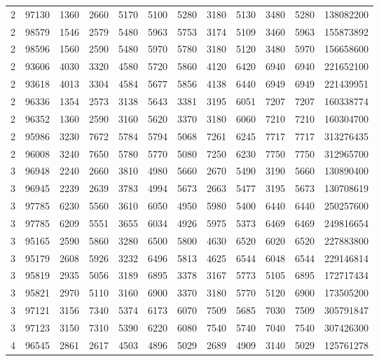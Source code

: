 \documentclass[journal]{IEEEtran}
\begin{document}
\begin{table}
\begin{tabular}{|cc|cccccccc|cc|}
2	&	97130	&	1360	&	2660	&	5170	&	5100	&	5280	&	3180	&	5130	&	3480	&	5280	&	138082200	\\
2	&	98579	&	1546	&	2579	&	5480	&	5963	&	5753	&	3174	&	5109	&	3460	&	5963	&	155873892	\\
2	&	98596	&	1560	&	2590	&	5480	&	5970	&	5780	&	3180	&	5120	&	3480	&	5970	&	156658600	\\
2	&	93606	&	4030	&	3320	&	4580	&	5720	&	5860	&	4120	&	6420	&	6940	&	6940	&	221652100	\\
2	&	93618	&	4013	&	3304	&	4584	&	5677	&	5856	&	4138	&	6440	&	6949	&	6949	&	221439951	\\
2	&	96336	&	1354	&	2573	&	3138	&	5643	&	3381	&	3195	&	6051	&	7207	&	7207	&	160338774	\\
2	&	96352	&	1360	&	2590	&	3160	&	5620	&	3370	&	3180	&	6060	&	7210	&	7210	&	160304700	\\
2	&	95986	&	3230	&	7672	&	5784	&	5794	&	5068	&	7261	&	6245	&	7717	&	7717	&	313276435	\\
2	&	96008	&	3240	&	7650	&	5780	&	5770	&	5080	&	7250	&	6230	&	7750	&	7750	&	312965700	\\
\hline																							
3	&	96948	&	2240	&	2660	&	3810	&	4980	&	5660	&	2670	&	5490	&	3190	&	5660	&	130890400	\\
3	&	96945	&	2239	&	2639	&	3783	&	4994	&	5673	&	2663	&	5477	&	3195	&	5673	&	130708619	\\
3	&	97785	&	6230	&	5560	&	3610	&	6050	&	4950	&	5980	&	5400	&	6440	&	6440	&	250257600	\\
3	&	97785	&	6209	&	5551	&	3655	&	6034	&	4926	&	5975	&	5373	&	6469	&	6469	&	249816654	\\
3	&	95165	&	2590	&	5860	&	3280	&	6500	&	5800	&	4630	&	6520	&	6020	&	6520	&	227883800	\\
3	&	95179	&	2608	&	5926	&	3232	&	6496	&	5813	&	4625	&	6544	&	6048	&	6544	&	229146814	\\
3	&	95819	&	2935	&	5056	&	3189	&	6895	&	3378	&	3167	&	5773	&	5105	&	6895	&	172717434	\\
3	&	95821	&	2970	&	5110	&	3160	&	6900	&	3370	&	3180	&	5770	&	5120	&	6900	&	173505200	\\
3	&	97121	&	3156	&	7340	&	5374	&	6173	&	6070	&	7509	&	5685	&	7030	&	7509	&	305791847	\\
3	&	97123	&	3150	&	7310	&	5390	&	6220	&	6080	&	7540	&	5740	&	7040	&	7540	&	307426300	\\
\hline																							
4	&	96545	&	2861	&	2617	&	4503	&	4896	&	5029	&	2689	&	4909	&	3140	&	5029	&	125761278	\\

\end{tabular}
\end{table}
\end{document}
